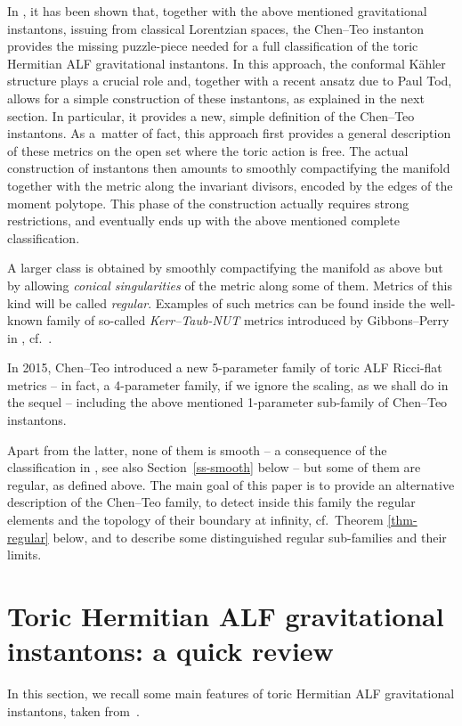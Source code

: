 \documentclass[pdftex]{sigma}
\numberwithin{equation}{section}
\begin{document}
In \cite{BG}, it has been shown that, together with the above mentioned gravitational instantons, issuing from classical Lorentzian spaces, the Chen--Teo instanton provides the missing puzzle-piece needed for a full classification of the toric Hermitian ALF gravitational instantons. In this approach, the conformal K\"ahler structure plays a crucial role and, together with a recent ansatz due to Paul Tod, allows for a simple construction of these instantons, as explained in the next section. In particular, it provides a new, simple definition of the Chen--Teo instantons. As a~matter of fact, this approach first provides a general description of these metrics on the open set where the toric action is free. The actual construction of instantons then amounts to smoothly compactifying the manifold together with the metric along the invariant divisors, encoded by the edges of the moment polytope. This phase of the construction actually requires strong restrictions, and eventually ends up with the above mentioned complete classification.

A larger class is obtained by smoothly compactifying the manifold as above but by allowing {\it conical singularities} of the metric along some of them. Metrics of this kind will be called {\it regular}. Examples of such metrics can be found inside the well-known family of so-called {\it Kerr--Taub-NUT} metrics introduced by Gibbons--Perry in \cite{GP}, cf.\ \cite[Section~7.2.1]{BG}.

In 2015, Chen--Teo introduced a new 5-parameter family of toric ALF Ricci-flat metrics -- in fact, a 4-parameter family, if we ignore the scaling, as we shall do in the sequel -- including the above mentioned 1-parameter sub-family of Chen--Teo instantons.

Apart from the latter, none of them is smooth -- a consequence of the classification in \cite{BG}, see also Section~\ref{ss-smooth} below -- but some of them are regular, as defined above.
The main goal of this paper is to provide an alternative description of the Chen--Teo family, to detect inside this family the regular elements and the topology of their boundary at infinity, cf.\ Theorem \ref{thm-regular} below, and to describe some distinguished regular sub-families and their limits.


\section{Toric Hermitian ALF gravitational instantons: a quick review} In this section, we recall some main features of toric Hermitian ALF gravitational instantons, taken from~\cite{BG}.
\end{document}
